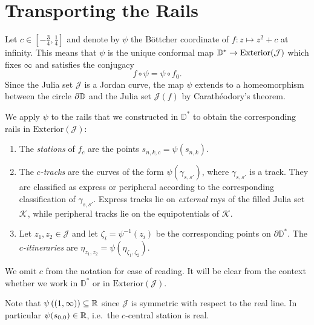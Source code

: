 	
\section{Transporting the Rails} \label{rails-section}
Let $c\in\left[-\frac 34,\frac{1}{4}\right]$ and denote by $\psi$ the Böttcher coordinate of $f: z\mapsto z^2+c$ at infinity. 
This means that $\psi$ is the unique conformal map $\mathbb{D}^{*}\to\mathrm{Exterior}(\mathcal{J})$  which fixes $\infty$ and satisfies the conjugacy $$f\circ\psi=\psi\circ f_{0}.$$
Since the Julia set $\mathcal J$ is a Jordan curve, the map $\psi$ extends to a homeomorphism between the circle $\partial\mathbb{D}$ and the Julia set $\mathcal{J}(f)$ by Carathéodory's
theorem.

We apply $\psi$ to the rails that we constructed in $\mathbb D^*$ to obtain the corresponding rails in $\mathrm{Exterior}(\mathcal{J})$:
\begin{definition} \leavevmode
\begin{enumerate}
	\item The 	\emph{stations} of $f_c$ are the points  $s_{n,k,c}=\psi(s_{n,k})$.


\item The \emph{$c$-tracks} are the curves of the form $\psi \left(\gamma_{s,s'}\right)$, where $\gamma_{s,s'}$ is a track. They are classified as express or peripheral according to the corresponding classification of $\gamma_{s,s'}$. 
Express tracks lie on \emph{external} rays of the filled Julia set $\mathcal K$, while peripheral tracks lie on the equipotentials of $\mathcal K$.

\item Let $z_1,z_2\in \mathcal J$ and let $\zeta_i=\psi^{-1}(z_i)$ be the corresponding points on $\partial \mathbb D^*$. 
The \emph{$c$-itineraries} are $\eta_{z_1,z_2}=\psi(\eta_{\zeta_1,\zeta_2})$.
\end{enumerate}

We omit $c$ from the notation for ease of reading. It will be clear from the context whether we work in $\mathbb D^*$ or in $\mathrm{Exterior}(\mathcal J)$.

\end{definition}

Note that $\psi\left((1,\infty)\right)\subseteq\mathbb{R}$ since $\mathcal{J}$ is symmetric with respect to the real line. In particular $\psi(s_{0,0})\in\mathbb{R}$, i.e.\ the $c$-central station is real.

